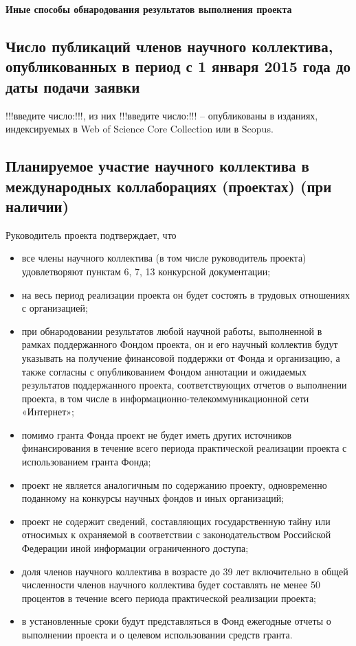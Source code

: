 \documentclass[12pt]{article}  %
\theoremstyle{remark}
\begin{document}
\textbf{Иные способы обнародования результатов выполнения проекта}

\subsection{Число публикаций членов научного коллектива, опубликованных в период с 1 января 2015 года до даты подачи заявки}

!!!введите число:!!!, из них !!!введите число:!!! – опубликованы в изданиях, индексируемых в Web of Science Core Collection или в Scopus.

\subsection{Планируемое участие научного коллектива в международных коллаборациях (проектах) (при наличии)}


\vline
Руководитель проекта подтверждает, что
\begin{itemize}
\item все члены научного коллектива (в том числе руководитель проекта) удовлетворяют пунктам 6, 7, 13 конкурсной документации;
\item на весь период реализации проекта он будет состоять в трудовых отношениях с организацией;
\item при обнародовании результатов любой научной работы, выполненной в рамках поддержанного Фондом проекта, он и его научный коллектив будут указывать на получение финансовой поддержки от Фонда и организацию, а также согласны с опубликованием Фондом аннотации и ожидаемых результатов поддержанного проекта, соответствующих отчетов о выполнении проекта, в том числе в информационно-телекоммуникационной сети «Интернет»;
\item помимо гранта Фонда проект не будет иметь других источников финансирования в течение всего периода практической реализации проекта с использованием гранта Фонда;
\item проект не является аналогичным по содержанию проекту, одновременно поданному на конкурсы научных фондов и иных организаций;
\item проект не содержит сведений, составляющих государственную тайну или относимых к охраняемой в соответствии с законодательством Российской Федерации иной информации ограниченного доступа;
\item доля членов научного коллектива в возрасте до 39 лет включительно в общей численности членов научного коллектива будет составлять не менее 50 процентов в течение всего периода практической реализации проекта;
\item в установленные сроки будут представляться в Фонд ежегодные отчеты о выполнении проекта и о целевом использовании средств гранта.
\end{itemize}
\end{document}
